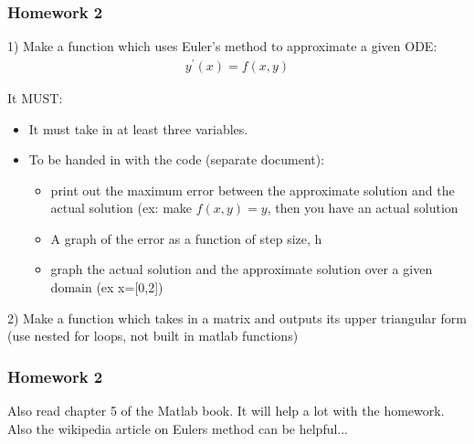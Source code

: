 \documentclass{beamer}
\begin{document}
\begin{frame}
\frametitle{Homework 2}

 1) Make a function which uses Euler's method to approximate a given ODE: 
\begin{align*}
y^{\prime}(x) = f(x,y)
\end{align*}

It MUST:
\begin{itemize}
\item It must take in at least three variables. 
\item To be handed in with the code (separate document):

\begin{itemize}
\item print out the maximum error between the approximate solution and the actual solution (ex: make $ f(x,y)=y$, then you have an actual solution 
\item A graph of the error as a function of step size, h
\item graph the actual solution and the approximate solution over a given domain (ex x=[0,2]) 
\end{itemize}
\end{itemize}

2) Make a function which takes in a matrix and outputs its upper triangular form (use nested for loops, not built in matlab functions)
\end{frame}

\begin{frame}
\frametitle{Homework 2} 

Also read chapter 5 of the Matlab book. It will help a lot with the homework. Also the wikipedia article on Eulers method can be helpful... 

\end{frame}
\end{document}
